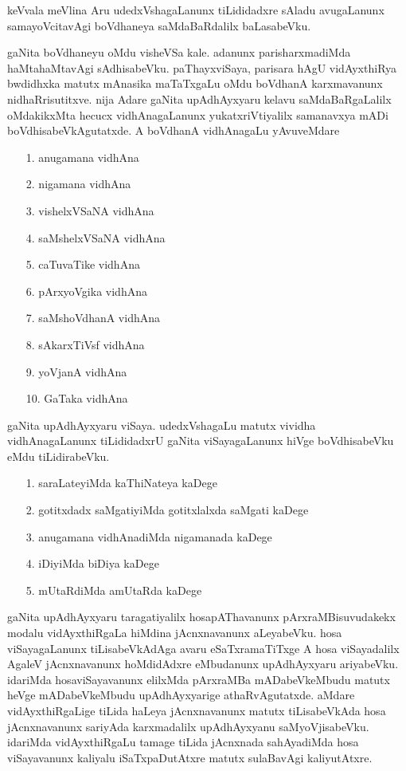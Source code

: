 keVvala meVlina Aru udedxVshagaLanunx tiLididadxre sAladu avugaLanunx sama\-yoVcitavAgi boVdhaneya saMdaBaRdalilx baLasabeVku.

gaNita boVdhaneyu oMdu visheVSa kale. adanunx parisharxmadiMda haMtahaMtavAgi sAdhisabeVku. paThayxviSaya,  parisara hAgU vidAyxthiRya bwdidhxka matutx mAnasika maTaTxgaLu oMdu boVdhanA karxmavanunx nidhaRrisutitxve. nija Adare gaNita upAdhAyxyaru kelavu saMdaBaRgaLalilx oMdakikxMta hecucx vidhAnagaLanunx yukatxriVtiyalilx samanavxya mADi boVdhisabeVkAgutatxde. A boVdhanA vidhAnagaLu yAvuveMdare
\begin{enumerate}
\item[{\rm 1.}] anugamana vidhAna
\item[{\rm 2.}] nigamana vidhAna
\item[{\rm 3.}] vishelxVSaNA vidhAna
\item[{\rm 4.}] saMshelxVSaNA vidhAna
\item[{\rm 5.}] caTuvaTike vidhAna
\item[{\rm 6.}] pArxyoVgika vidhAna
\item[{\rm 7.}] saMshoVdhanA vidhAna
\item[{\rm 8.}] sAkarxTiVsf vidhAna
\item[{\rm 9.}] yoVjanA vidhAna
\item[{\rm 10.}] GaTaka vidhAna
\end{enumerate}

gaNita upAdhAyxyaru viSaya. udedxVshagaLu matutx vividha vidhAnagaLanunx tiLididadxrU gaNita viSayagaLanunx hiVge boVdhisabeVku eMdu tiLidirabeVku.
\begin{enumerate}
\item[{\rm 1.}] saraLateyiMda kaThiNateya kaDege
\item[{\rm 2.}] gotitxdadx saMgatiyiMda gotitxlalxda saMgati kaDege
\item[{\rm 3.}] anugamana vidhAnadiMda nigamanada kaDege
\item[{\rm 4.}] iDiyiMda biDiya kaDege
\item[{\rm 5.}] mUtaRdiMda amUtaRda kaDege
\end{enumerate}

gaNita upAdhAyxyaru taragatiyalilx hosapAThavanunx pArxraMBisuvudakekx modalu vidAyxthiRgaLa hiMdina jAcnxnavanunx aLeyabeVku. hosa viSayagaLanunx tiLisabeVkAdAga avaru eSaTxramaTiTxge A hosa viSayadalilx AgaleV jAcnxnavanunx hoMdidAdxre eMbudanunx upAdhAyxyaru ariyabeVku. idariMda hosaviSayavanunx elilxMda pArxraMBa mADabeVkeMbudu matutx heVge mADabeVkeMbudu upAdhAyxyarige athaRvAgutatxde. aMdare vidAyxthiRgaLige tiLida haLeya jAcnxnavanunx matutx tiLisabeVkAda hosa jAcnxnavanunx sariyAda karxmadalilx upAdhAyxyanu saMyoVjisabeVku. idariMda vidAyxthiRgaLu tamage tiLida jAcnxnada sahAyadiMda hosa viSayavanunx kaliyalu iSaTxpaDutAtxre matutx sulaBavAgi kaliyutAtxre.

